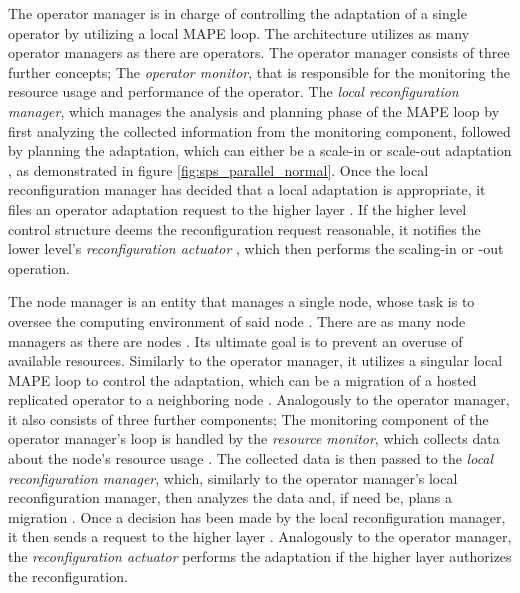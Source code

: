         \quad The operator manager is in charge of controlling the adaptation of a single operator by utilizing a local MAPE loop.
        The architecture utilizes as many operator managers as there are operators.
        The operator manager consists of three further concepts;
        The \textit{operator monitor}, that is responsible for the monitoring the resource usage and performance of the operator.
        The \textit{local reconfiguration manager}, which manages the analysis and planning phase of the MAPE loop by first analyzing the collected information 
        from the monitoring component, followed by planning the adaptation, which can either be a scale-in or scale-out adaptation \cite[p. 175]{cardellini}, 
        as demonstrated in figure \ref{fig:sps_parallel_normal}.
        Once the local reconfiguration manager has decided that a local adaptation is appropriate, it files an operator adaptation request to the higher layer \cite[p. 175]{cardellini}.
        If the higher level control structure deems the reconfiguration request reasonable, it notifies the lower level's \textit{reconfiguration actuator} \cite[p. 176]{cardellini}, which then 
        performs the scaling-in or -out operation.

        \quad The node manager is an entity that manages a single node, whose task is to oversee the computing environment of said node \cite[p. 175]{cardellini}.
        There are as many node managers as there are nodes \cite[p. 175]{cardellini}.
        Its ultimate goal is to prevent an overuse of available resources.
        Similarly to the operator manager, it utilizes a singular local MAPE loop to control the adaptation, 
        which can be a migration of a hosted replicated operator to a neighboring node \cite[p. 175]{cardellini}. 
        Analogously to the operator manager, it also consists of three further components;
        The monitoring component of the operator manager's loop is handled by the \textit{resource monitor}, which collects data about the node's resource usage \cite[p. 176]{cardellini}.
        The collected data is then passed to the \textit{local reconfiguration manager}, which, similarly to the operator manager's local reconfiguration manager, then
        analyzes the data and, if need be, plans a migration \cite[p. 176]{cardellini}. 
        Once a decision has been made by the local reconfiguration manager, it then sends a request to the higher layer \cite[p. 176]{cardellini}. Analogously to the operator manager, the \textit{reconfiguration actuator} performs
        the adaptation if the higher layer authorizes the reconfiguration.

